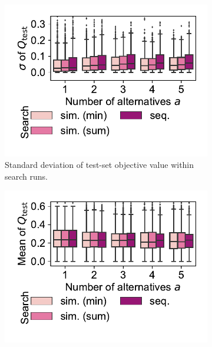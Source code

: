 \documentclass{article}
\theoremstyle{definition}
\begin{document}
\begin{figure}[p]
\begin{subfigure}[t]{0.48\textwidth}
		\label{fig:afs:impact-search-mean-train-objective}
	\end{subfigure}
	\\ \vspace{\baselineskip}
	\begin{subfigure}[t]{0.48\textwidth}
		\centering
		\includegraphics[width=\textwidth, trim=15 25 15 15, clip]{plots/afs-impact-search-stddev-test-objective.pdf}
		\caption{Standard deviation of test-set objective value within search runs.}
		\label{fig:afs:impact-search-stddev-test-objective}
	\end{subfigure}
	\hfill
	\begin{subfigure}[t]{0.48\textwidth}
		\centering
		\includegraphics[width=\textwidth, trim=15 25 15 15, clip]{plots/afs-impact-search-mean-test-objective.pdf}

\end{subfigure}
\end{figure}
\end{document}
